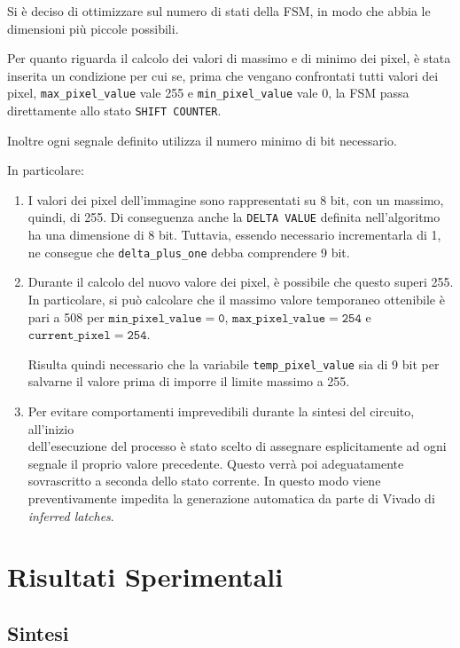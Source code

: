 \documentclass[11pt]{article}
\begin{document}
    Si è deciso di ottimizzare sul numero di stati della FSM, in modo che abbia le dimensioni più piccole possibili. 
    
    Per quanto riguarda il calcolo dei valori di massimo e di minimo dei pixel, è stata inserita un condizione per cui se, prima che vengano confrontati tutti valori dei pixel, \texttt{max\_pixel\_value} vale 255 e \texttt{min\_pixel\_value} vale 0, la FSM passa direttamente allo stato \texttt{SHIFT COUNTER}.
    
    Inoltre ogni segnale definito utilizza il numero minimo di bit necessario.
    
    In particolare:
    \begin{enumerate}
        \item I valori dei pixel dell'immagine sono rappresentati su 8 bit, con un massimo, quindi, di 255. Di conseguenza anche la \texttt{DELTA VALUE} definita nell'algoritmo ha una dimensione di 8 bit. Tuttavia, essendo necessario incrementarla di 1, ne consegue che \texttt{delta\_plus\_one} debba comprendere 9 bit.
        
        \item Durante il calcolo del nuovo valore dei pixel, è possibile che questo superi 255. In particolare, si può calcolare che il massimo valore temporaneo ottenibile è pari a 508 per $\mathtt{min\_pixel\_value = 0}$, $\mathtt{max\_pixel\_value = 254}$ e $\mathtt{current\_pixel = 254}$.
        
        Risulta quindi necessario che la variabile \texttt{temp\_pixel\_value} sia di 9 bit per salvarne il valore prima di imporre il limite massimo a 255.
        
        \item Per evitare comportamenti imprevedibili durante la sintesi del circuito, all'inizio \\dell'esecuzione del processo è stato scelto di assegnare esplicitamente ad ogni segnale il proprio valore precedente.
        Questo verrà poi adeguatamente sovrascritto a seconda dello stato corrente.
        In questo modo viene preventivamente impedita la generazione automatica da parte di Vivado di \emph{inferred latches}.
        
    \end{enumerate}
\newpage
\section{Risultati Sperimentali}

    \subsection{Sintesi}
    
\end{document}
